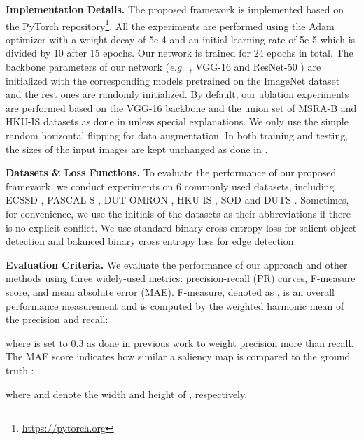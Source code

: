 \documentclass[10pt,twocolumn,letterpaper]{article}
\def\eg{\emph{e.g.~}}
\newcommand{\myPara}[1]{\vspace{.05in}\noindent\textbf{#1.}}
\begin{document}
\myPara{Implementation Details}
The proposed framework is implemented based on the PyTorch repository\footnote{\url{https://pytorch.org}}.
All the experiments are performed using the Adam \cite{kingma2014adam} optimizer with a weight decay of
5e-4 and an initial learning rate of 5e-5 
which is divided by 10 after 15 epochs.
Our network is trained for 24 epochs in total.
The backbone parameters of our network (\eg, VGG-16 \cite{simonyan2014very} and 
ResNet-50 \cite{He2016}) are initialized with the corresponding models pretrained on 
the ImageNet dataset \cite{krizhevsky2012imagenet} 
and the rest ones are randomly initialized.
By default, our ablation experiments are performed based on 
the VGG-16 backbone and the union set of MSRA-B \cite{liu2011learning} and HKU-IS \cite{li2015visual} datasets 
as done in \cite{li2017instance} unless special explanations.
We only use the simple random horizontal flipping for data augmentation.
In both training and testing, the sizes of the input images are kept unchanged as done in \cite{hou2016deeply}.



\myPara{Datasets \& Loss Functions}
To evaluate the performance of our proposed framework, we conduct experiments on
6 commonly used datasets, including ECSSD \cite{yan2013hierarchical}, 
PASCAL-S \cite{li2014secrets}, DUT-OMRON \cite{yang2013saliency}, 
HKU-IS \cite{li2015visual}, SOD \cite{movahedi2010design} and DUTS \cite{wang2017learning}.
Sometimes, for convenience, we use the initials of the datasets as their abbreviations
if there is no explicit conflict.
We use standard binary cross entropy loss for salient object detection and 
balanced binary cross entropy loss \cite{xie2015holistically} for edge detection.

\myPara{Evaluation Criteria}
We evaluate the performance of our approach and other methods using three
widely-used metrics: precision-recall (PR) curves, F-measure score, 
and mean absolute error (MAE).
F-measure, denoted as , is an overall performance measurement and is computed 
by the weighted harmonic mean of the precision and recall:

where  is set to 0.3 as done in previous work to weight precision more than recall.
The MAE score indicates how similar a saliency map  is compared to the ground truth :

where  and  denote the width and height of , respectively.
\end{document}
